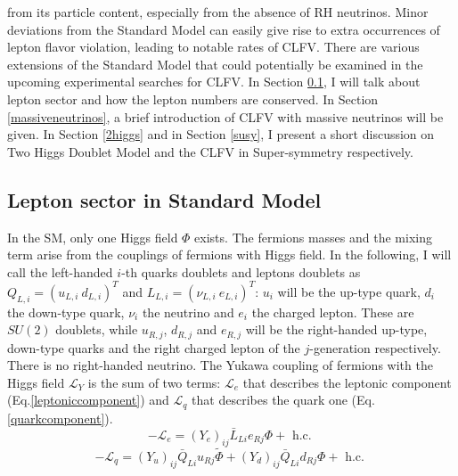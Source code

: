 from its particle content, especially from the absence of RH neutrinos. Minor deviations from the Standard Model can easily give rise to extra occurrences of lepton flavor violation, leading to notable rates of CLFV.
There are various extensions of the Standard Model that could potentially be examined in the upcoming experimental searches for CLFV.
In Section \ref{leptonsector}, I will talk about lepton sector and how the lepton numbers are conserved. In Section \ref{massiveneutrinos}, a brief introduction of CLFV with massive neutrinos will be given.
In Section \ref{2higgs} and in Section \ref{susy}, I present a short discussion on Two Higgs Doublet Model and the CLFV in Super-symmetry respectively.
\subsection{Lepton sector in Standard Model}\label{leptonsector}
In the SM, only one Higgs field $\Phi$ exists. The fermions masses and the mixing term arise from the couplings of fermions with Higgs field. In the following, I will call the left-handed $i$-th quarks doublets and leptons doublets as $Q_{L,i}=(u_{L,i} \ d_{L,i})^T$ and $L_{L,i}=(\nu_{L,i} \ e_{L,i})^T$: $u_i$ will be the up-type quark, $d_i$ the down-type quark, $\nu_i$ the neutrino and $e_i$ the charged lepton. These are $SU(2)$ doublets, while $u_{R,j}$, $d_{R,j}$ and $e_{R,j}$ will be the right-handed up-type, down-type quarks and the right charged lepton of the $j$-generation respectively. There is no right-handed neutrino. The Yukawa coupling of fermions with the Higgs field $\mathscr{L}_Y$ is the sum of two terms: $\mathscr{L}_e$ that describes the leptonic component (Eq.\ref{leptoniccomponent}) and $\mathscr{L}_q$ that describes the quark one (Eq.\ref{quarkcomponent}).
\begin{equation}\label{leptoniccomponent}
    -\mathscr{L}_e=\left(Y_e\right)_{i j} \bar{L}_{L i} e_{R j} \Phi+ \text{ h.c. }
\end{equation}
\begin{equation}\label{quarkcomponent}
        -\mathscr{L}_q=\left(Y_u\right)_{i j} \bar{Q}_{L i} u_{R j} \widetilde{\Phi}+\left(Y_d\right)_{i j} \bar{Q}_{L i} d_{R j} \Phi+\text { h.c. }
\end{equation}

